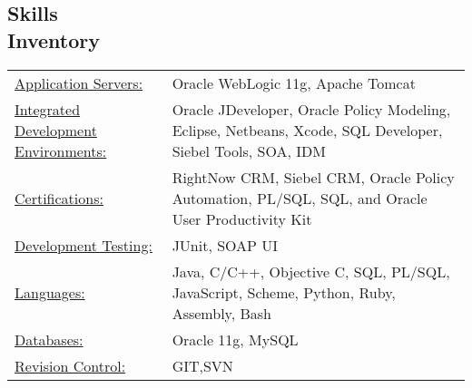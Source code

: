 \documentclass[margin]{res}
\begin{document}
\begin{resume}
\section{Skills \\ Inventory}
   \begin{tabular}{l p{3in}}
    \underline{Application Servers:} & Oracle WebLogic 11g, Apache Tomcat \\
    \underline{Integrated Development Environments:} & Oracle JDeveloper, 
    			Oracle Policy Modeling, Eclipse, Netbeans, Xcode, SQL Developer, 
    			Siebel Tools, SOA, IDM \\
    \underline{Certifications:} & RightNow CRM, Siebel CRM, Oracle Policy Automation,
    			PL/SQL, SQL, and Oracle User Productivity Kit \\
	\underline{Development Testing:} & JUnit, SOAP UI \\
	\underline{Languages:} & Java, C/C++, Objective C, SQL, PL/SQL, JavaScript,
				Scheme, Python, Ruby, Assembly, Bash \\
	\underline{Databases:} & Oracle 11g, MySQL \\
	\underline{Revision Control:} & GIT,SVN \\
 \end{tabular}

\end{resume} 
\end{document}
